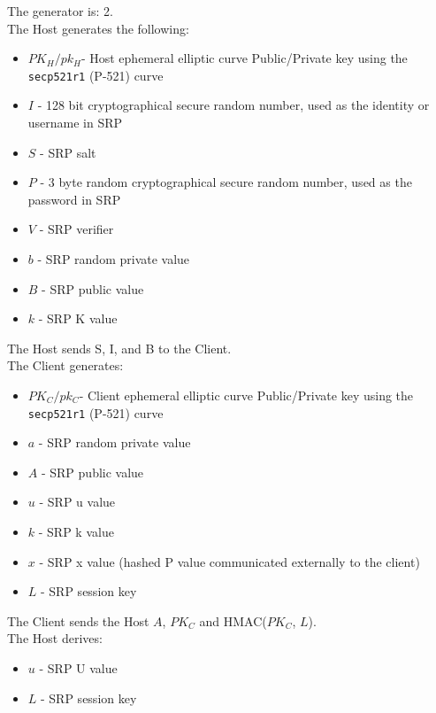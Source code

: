 \documentclass{article}
\begin{document}
    The generator is: 2.\\

    The Host generates the following:\\

    \begin{itemize}
        \item $PK_H/pk_H$- Host ephemeral elliptic curve Public/Private
        key using the \texttt{secp521r1} (P-521) curve
        \item $I$ - 128 bit cryptographical secure random number, used as the identity or
        username in SRP
        \item $S$ - SRP salt
        \item $P$ - 3 byte random cryptographical secure random number, used as the password
        in SRP
        \item $V$ - SRP verifier
        \item $b$ - SRP random private value
        \item $B$ - SRP public value
        \item $k$ - SRP K value
    \end{itemize}

    The Host sends S, I, and B to the Client.\\

    The Client generates:\\

    \begin{itemize}
        \item $PK_C/pk_C$- Client ephemeral elliptic curve Public/Private
        key using the \texttt{secp521r1} (P-521) curve
        \item $a$ - SRP random private value
        \item $A$ - SRP public value
        \item $u$ - SRP u value
        \item $k$ - SRP k value
        \item $x$ - SRP x value (hashed P value communicated externally to the client)
        \item $L$ - SRP session key
    \end{itemize}

    The Client sends the Host $A$, $PK_C$ and HMAC($PK_C$, $L$).\\

    The Host derives:\\

    \begin{itemize}
        \item $u$ - SRP U value
        \item $L$ - SRP session key
    \end{itemize}
\end{document}
